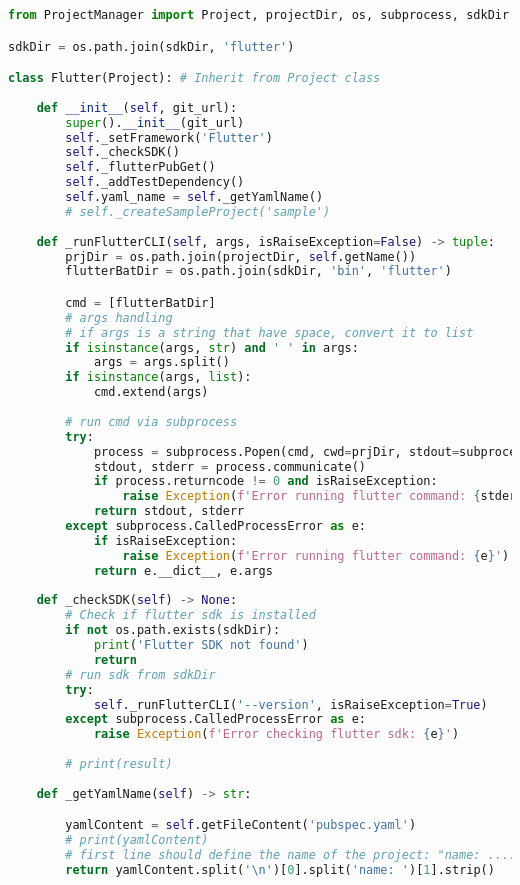 \begin{lstlisting}[language=Python, caption={$\texttt{Flutter}$ class - subclass of Project.}, label={lst:2}]
from ProjectManager import Project, projectDir, os, subprocess, sdkDir

sdkDir = os.path.join(sdkDir, 'flutter')

class Flutter(Project): # Inherit from Project class
    
    def __init__(self, git_url):
        super().__init__(git_url)
        self._setFramework('Flutter')
        self._checkSDK()
        self._flutterPubGet()
        self._addTestDependency()
        self.yaml_name = self._getYamlName()
        # self._createSampleProject('sample')
        
    def _runFlutterCLI(self, args, isRaiseException=False) -> tuple:
        prjDir = os.path.join(projectDir, self.getName())
        flutterBatDir = os.path.join(sdkDir, 'bin', 'flutter')

        cmd = [flutterBatDir]
        # args handling
        # if args is a string that have space, convert it to list
        if isinstance(args, str) and ' ' in args:
            args = args.split()
        if isinstance(args, list):
            cmd.extend(args)
            
        # run cmd via subprocess
        try:
            process = subprocess.Popen(cmd, cwd=prjDir, stdout=subprocess.PIPE, stderr=subprocess.PIPE, universal_newlines=True, encoding='utf-8', shell=True)
            stdout, stderr = process.communicate()
            if process.returncode != 0 and isRaiseException:
                raise Exception(f'Error running flutter command: {stderr}')
            return stdout, stderr
        except subprocess.CalledProcessError as e:
            if isRaiseException:
                raise Exception(f'Error running flutter command: {e}')
            return e.__dict__, e.args
    
    def _checkSDK(self) -> None:
        # Check if flutter sdk is installed
        if not os.path.exists(sdkDir):
            print('Flutter SDK not found')
            return
        # run sdk from sdkDir
        try:
            self._runFlutterCLI('--version', isRaiseException=True)
        except subprocess.CalledProcessError as e:
            raise Exception(f'Error checking flutter sdk: {e}')
        
        # print(result)
    
    def _getYamlName(self) -> str:

        yamlContent = self.getFileContent('pubspec.yaml')
        # print(yamlContent)
        # first line should define the name of the project: "name: ....."
        return yamlContent.split('\n')[0].split('name: ')[1].strip()


\end{lstlisting}
